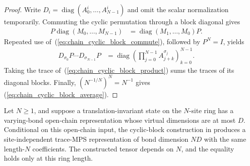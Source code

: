 \begin{proof}
    \leanok
    Write $D_i=\operatorname{diag}(A_0^i,\ldots,A_{N-1}^i)$ and omit the
    scalar normalization temporarily. Commuting the cyclic permutation through
    a block diagonal gives
    \begin{align}
        P\operatorname{diag}(M_0,\ldots,M_{N-1})
         & =\operatorname{diag}(M_1,\ldots,M_0)P.
        \label{eq:chain_cyclic_block_commute}
    \end{align}
    Repeated use of~(\ref{eq:chain_cyclic_block_commute}), followed by
    $P^N=I$, yields
    \begin{align}
        D_{\sigma_0}P\cdots D_{\sigma_{N-1}}P
         & =\operatorname{diag}\left(
        \prod_{j=0}^{N-1}A_{j+k}^{\sigma_j}
        \right)_{k=0}^{N-1}.
        \label{eq:chain_cyclic_block_product}
    \end{align}
    Taking the trace of~(\ref{eq:chain_cyclic_block_product}) sums the traces
    of its diagonal blocks. Finally,
    $(N^{-1/N})^N=N^{-1}$ gives
    (\ref{eq:chain_cyclic_block_average}).
\end{proof}

\begin{lemma}
    \label{thm:pgvwc07_site_independent_matrices}
    \leanok
    Let $N\geq1$, and suppose a translation-invariant state on the $N$-site
    ring has a varying-bond open-chain representation whose virtual dimensions are
    at most $D$. Conditional on this open-chain input, the cyclic-block construction in
    \cite[Theorem~3]{PerezGarcia2007Matrix} produces a site-independent trace-MPS representation of
    bond dimension $ND$ with the same length-$N$ coefficients.
    The constructed tensor depends on $N$, and the equality holds only
    at this ring length.
\end{lemma}

